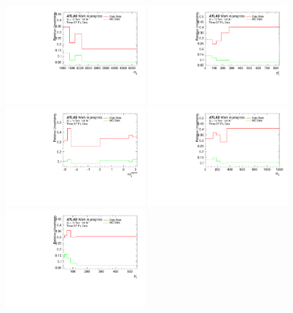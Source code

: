 \begin{figure}[t]
  \centering
  \includegraphics[width=0.48\textwidth]{plots/diffx/statunc/data/relative_datastats_mjj_27Nov.pdf}
  \includegraphics[width=0.48\textwidth]{plots/diffx/statunc/data/relative_datastats_jj_pt_27Nov.pdf}
  \includegraphics[width=0.48\textwidth]{plots/diffx/statunc/data/relative_datastats_jj_dphi_27Nov.pdf}
  \includegraphics[width=0.48\textwidth]{plots/diffx/statunc/data/relative_datastats_ly_m_27Nov.pdf}
  \includegraphics[width=0.48\textwidth]{plots/diffx/statunc/data/relative_datastats_lep_pt_27Nov.pdf}

\end{figure}
